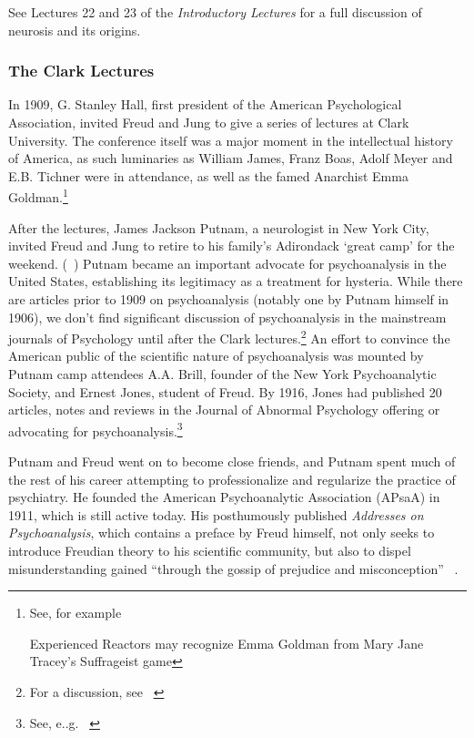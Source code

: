 \begin{refsection}
See Lectures 22 and 23 of the \emph{Introductory Lectures} for a full discussion of neurosis and its origins.

\subsubsection{The Clark Lectures}
\label{theclarklectures}

In 1909, G. Stanley Hall, first president of the American Psychological Association, invited Freud and Jung to give a series of lectures at Clark University. The conference itself was a major moment in the intellectual history of America, as such luminaries as William James, Franz Boas, Adolf Meyer and E.B. Tichner were in attendance, as well as the famed Anarchist Emma Goldman.\footnote{See, for example ~\citep{Jacoby:2009tt}

Experienced Reactors may recognize Emma Goldman from Mary Jane Tracey's Suffrageist game}

After the lectures, James Jackson Putnam, a neurologist in New York City, invited Freud and Jung to retire to his family's Adirondack `great camp' for the weekend. (~\citep{Prochnik:FiwLnN1z}) Putnam became an important advocate for psychoanalysis in the United States, establishing its legitimacy as a treatment for hysteria. While there are articles prior to 1909 on psychoanalysis (notably one by Putnam himself in 1906), we don't find significant discussion of psychoanalysis in the mainstream journals of Psychology until after the Clark lectures.\footnote{For a discussion, see ~\citep{Hornstein:2002wq}} An effort to convince the American public of the scientific nature of psychoanalysis was mounted by Putnam camp attendees A.A. Brill, founder of the New York Psychoanalytic Society, and Ernest Jones, student of Freud. By 1916, Jones had published 20 articles, notes and reviews in the Journal of Abnormal Psychology offering or advocating for psychoanalysis.\footnote{See, e..g. ~\citep[p. 474]{Hornstein:2002wq}}

Putnam and Freud went on to become close friends, and Putnam spent much of the rest of his career attempting to professionalize and regularize the practice of psychiatry. He founded the American Psychoanalytic Association (APsaA) in 1911, which is still active today. His posthumously published \emph{Addresses on Psychoanalysis}, which contains a preface by Freud himself, not only seeks to introduce Freudian theory to his scientific community, but also to dispel misunderstanding gained “through the gossip of prejudice and misconception” ~\citep[p. 3]{Putnam:1921uc}.


\end{refsection}
